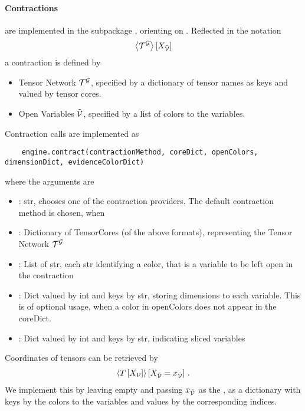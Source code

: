 \paragraph{Contractions} are implemented in the subpackage \spengine, orienting on .
Reflected in the notation
\begin{align*}
    \left\langle \mathcal{T}^{\mathcal{G}}\right\rangle \left[ X_{\tilde{\mathcal{V}}} \right]
\end{align*}
a contraction is defined by
\begin{itemize}
    \item Tensor Network $\mathcal{T}^{\mathcal{G}}$, specified by a dictionary of tensor names as keys and valued by tensor cores.
    \item Open Variables $\tilde{\mathcal{V}}$, specified by a list of colors to the variables.
\end{itemize}
Contraction calls are implemented as
\begin{lstlisting}
	engine.contract(contractionMethod, coreDict, openColors, dimensionDict, evidenceColorDict)
\end{lstlisting}
where the arguments are
\begin{itemize}
    \item {}: str, chooses one of the contraction providers. The default contraction method  is chosen, when
    \item {}: Dictionary of TensorCores (of the above formats), representing the Tensor Network $\mathcal{T}^{\mathcal{G}}$
    \item {}: List of str, each str identifying a color, that is a variable to be left open in the contraction
    \item {}: Dict valued by int and keys by str, storing dimensions to each variable. This is of optional usage, when a color in openColors does not appear in the coreDict.
    \item {}: Dict valued by int and keys by str, indicating sliced variables
\end{itemize}

Coordinates of tensors can be retrieved by
\begin{align*}
    \left\langle T\left[X_{\mathcal{V}}\right]\right\rangle \left[ X_{\tilde{\mathcal{V}}}=x_{\tilde{\mathcal{V}}} \right] \, .
\end{align*}
We implement this by leaving  empty and passing $x_{\tilde{\mathcal{V}}}$ as the , as a dictionary with keys by the  colors to the variables and values by the corresponding  indices.

